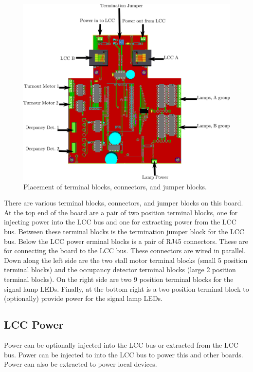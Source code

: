 \begin{figure}[hbpt]\begin{centering}%
\includegraphics[width=5in]{ESP32HalfSidingWiring.png}
\caption{Placement of terminal blocks, connectors, and jumper blocks.}
\end{centering}\end{figure}
There are various terminal blocks, connectors, and jumper blocks on this
board. At the top end of the board are a pair of two position terminal blocks, 
one for injecting power into the LCC bus and one for extracting power from the 
LCC bus.  Between these terminal blocks is the termination jumper block for 
the LCC bus.  Below the LCC  power erminal blocks is a pair of RJ45 
connectors. These are for connecting the board to the LCC bus.  These 
connectors are wired in parallel.  Down along the left side are the two stall 
motor terminal blocks (small 5 position terminal blocks) and the occupancy 
detector terminal blocks (large 2 position terminal blocks).  On the right 
side are two 9 position terminal blocks for the signal lamp LEDs.  Finally, at 
the bottom right is a two position terminal block to (optionally) provide 
power for the signal lamp LEDs.

\subsection{LCC Power}

Power can be optionally injected into the LCC bus or extracted from the LCC 
bus. Power can be injected to into the LCC bus to power this and other boards. 
Power can also be extracted to power local devices.

